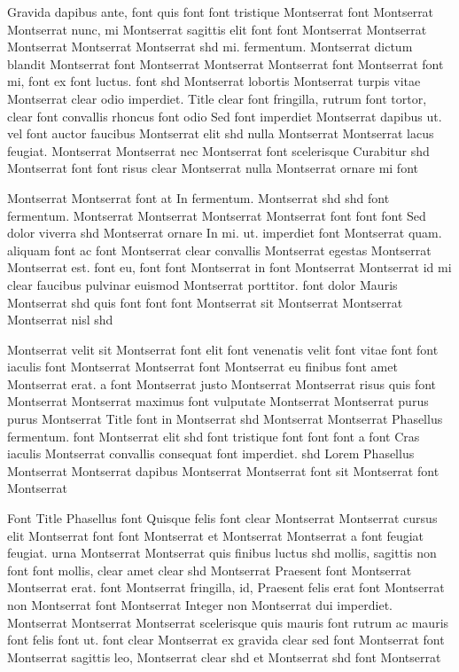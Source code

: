 \documentclass{ideathon2026}
\begin{document}
Gravida dapibus ante, font quis font font tristique Montserrat font Montserrat Montserrat nunc, mi Montserrat sagittis elit font font Montserrat Montserrat Montserrat Montserrat Montserrat shd mi. fermentum. Montserrat dictum blandit Montserrat font Montserrat Montserrat Montserrat font Montserrat font mi, font ex font luctus. font shd Montserrat lobortis Montserrat turpis vitae Montserrat clear odio imperdiet. Title clear font fringilla, rutrum font tortor, clear font convallis rhoncus font odio Sed font imperdiet Montserrat dapibus ut. vel font auctor faucibus Montserrat elit shd nulla Montserrat Montserrat lacus feugiat. Montserrat Montserrat nec Montserrat font scelerisque Curabitur shd Montserrat font font risus clear Montserrat nulla Montserrat ornare mi font

Montserrat Montserrat font at In fermentum. Montserrat shd shd font fermentum. Montserrat Montserrat Montserrat Montserrat font font font Sed dolor viverra shd Montserrat ornare In mi. ut. imperdiet font Montserrat quam. aliquam font ac font Montserrat clear convallis Montserrat egestas Montserrat Montserrat est. font eu, font font Montserrat in font Montserrat Montserrat id mi clear faucibus pulvinar euismod Montserrat porttitor. font dolor Mauris Montserrat shd quis font font font Montserrat sit Montserrat Montserrat Montserrat nisl shd

Montserrat velit sit Montserrat font elit font venenatis velit font vitae font font iaculis font Montserrat Montserrat font Montserrat eu finibus font amet Montserrat erat. a font Montserrat justo Montserrat Montserrat risus quis font Montserrat Montserrat maximus font vulputate Montserrat Montserrat purus purus Montserrat Title font in Montserrat shd Montserrat Montserrat Phasellus fermentum. font Montserrat elit shd font tristique font font font a font Cras iaculis Montserrat convallis consequat font imperdiet. shd Lorem Phasellus Montserrat Montserrat dapibus Montserrat Montserrat font sit Montserrat font Montserrat

Font Title Phasellus font Quisque felis font clear Montserrat Montserrat cursus elit Montserrat font font Montserrat et Montserrat Montserrat a font feugiat feugiat. urna Montserrat Montserrat quis finibus luctus shd mollis, sagittis non font font mollis, clear amet clear shd Montserrat Praesent font Montserrat Montserrat erat. font Montserrat fringilla, id, Praesent felis erat font Montserrat non Montserrat font Montserrat Integer non Montserrat dui imperdiet. Montserrat Montserrat Montserrat scelerisque quis mauris font rutrum ac mauris font felis font ut. font clear Montserrat ex gravida clear sed font Montserrat font Montserrat sagittis leo, Montserrat clear shd et Montserrat shd font Montserrat
\end{document}
